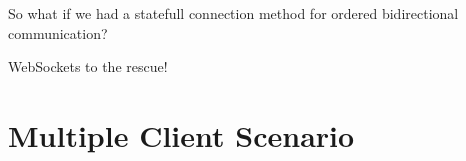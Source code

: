 \documentclass{beamer}
\begin{document}
\begin{frame}
    \centering
    So what if we had a statefull connection method for ordered bidirectional
    communication?
\end{frame}

\begin{frame}
    \centering
    WebSockets to the rescue!
\end{frame}

\section{Multiple Client Scenario}
\end{document}

